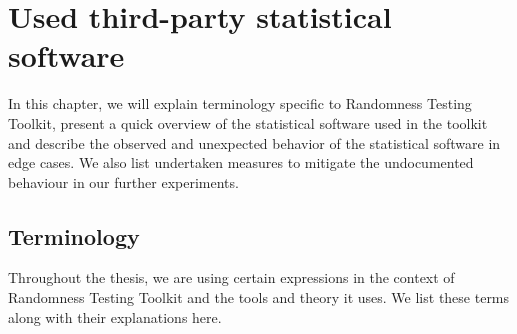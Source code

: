 \documentclass[
	digital,    %
	oneside,    %
	color,
	11pt,
	nocover,
	notable,
	nolof,
	nolot,
]{fithesis3}
\theoremstyle{definition}
\theoremstyle{remark}
\begin{document}
\chapter{Used third-party statistical software}
\label{chap:batteries}
In this chapter, we will explain terminology specific to Randomness Testing Toolkit, present a quick overview of the statistical software used in the toolkit and describe the observed and unexpected behavior of the statistical software in edge cases. We also list undertaken measures to mitigate the undocumented behaviour in our further experiments.

\section{Terminology}
\label{sec:terminology}
Throughout the thesis, we are using certain expressions in the context of Randomness Testing Toolkit and the tools and theory it uses. We list these terms along with their explanations here.
\end{document}
